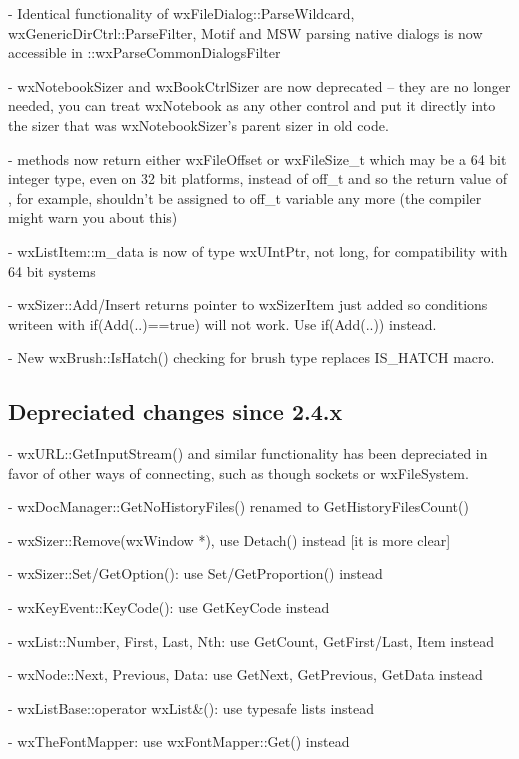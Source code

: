 - Identical functionality of wxFileDialog::ParseWildcard,
  wxGenericDirCtrl::ParseFilter, Motif and MSW parsing native dialogs
  is now accessible in ::wxParseCommonDialogsFilter

- wxNotebookSizer and wxBookCtrlSizer are now deprecated -- they are no longer
  needed, you can treat wxNotebook as any other control and put it directly
  into the sizer that was wxNotebookSizer's parent sizer in old code.

-  methods now return either wxFileOffset or wxFileSize\_t which may be a
  64 bit integer type, even on 32 bit platforms, instead of off\_t and so the
  return value of , for example, shouldn't be assigned to off\_t
  variable any more (the compiler might warn you about this)

- wxListItem::m\_data is now of type wxUIntPtr, not long, for compatibility
  with 64 bit systems

- wxSizer::Add/Insert returns pointer to wxSizerItem just added so conditions
  writeen with if(Add(..)==true) will not work. Use if(Add(..)) instead.

- New wxBrush::IsHatch() checking for brush type replaces IS_HATCH macro.



\subsection{Depreciated changes since 2.4.x}\label{depreciatedsince24}

- wxURL::GetInputStream() and similar functionality has been depreciated in
  favor of other ways of connecting, such as though sockets or wxFileSystem.

- wxDocManager::GetNoHistoryFiles() renamed to GetHistoryFilesCount()

- wxSizer::Remove(wxWindow *), use Detach() instead [it is more clear]

- wxSizer::Set/GetOption(): use Set/GetProportion() instead

- wxKeyEvent::KeyCode(): use GetKeyCode instead

- wxList::Number, First, Last, Nth: use GetCount, GetFirst/Last, Item instead

- wxNode::Next, Previous, Data: use GetNext, GetPrevious, GetData instead

- wxListBase::operator wxList&(): use typesafe lists instead

- wxTheFontMapper: use wxFontMapper::Get() instead

